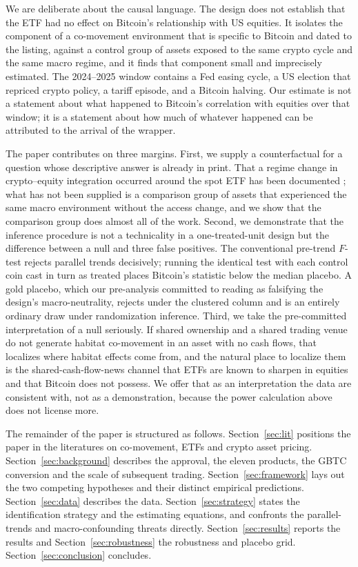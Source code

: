 \documentclass[12pt,a4paper]{article}
\begin{document}
We are deliberate about the causal language. The design does not establish that the ETF had no effect on Bitcoin's relationship with US equities. It isolates the component of a co-movement environment that is specific to Bitcoin and dated to the listing, against a control group of assets exposed to the same crypto cycle and the same macro regime, and it finds that component small and imprecisely estimated. The 2024--2025 window contains a Fed easing cycle, a US election that repriced crypto policy, a tariff episode, and a Bitcoin halving. Our estimate is not a statement about what happened to Bitcoin's correlation with equities over that window; it is a statement about how much of whatever happened can be attributed to the arrival of the wrapper.

The paper contributes on three margins. First, we supply a counterfactual for a question whose descriptive answer is already in print. That a regime change in crypto--equity integration occurred around the spot ETF has been documented \citep{khatib2026from}; what has not been supplied is a comparison group of assets that experienced the same macro environment without the access change, and we show that the comparison group does almost all of the work. Second, we demonstrate that the inference procedure is not a technicality in a one-treated-unit design but the difference between a null and three false positives. The conventional pre-trend $F$-test rejects parallel trends decisively; running the identical test with each control coin cast in turn as treated places Bitcoin's statistic below the median placebo. A gold placebo, which our pre-analysis committed to reading as falsifying the design's macro-neutrality, rejects under the clustered column and is an entirely ordinary draw under randomization inference. Third, we take the pre-committed interpretation of a null seriously. If shared ownership and a shared trading venue do not generate habitat co-movement in an asset with no cash flows, that localizes where habitat effects come from, and the natural place to localize them is the shared-cash-flow-news channel that ETFs are known to sharpen in equities \citep{glosten2020etf,israeli2017is} and that Bitcoin does not possess. We offer that as an interpretation the data are consistent with, not as a demonstration, because the power calculation above does not license more.

The remainder of the paper is structured as follows. Section~\ref{sec:lit} positions the paper in the literatures on co-movement, ETFs and crypto asset pricing. Section~\ref{sec:background} describes the approval, the eleven products, the GBTC conversion and the scale of subsequent trading. Section~\ref{sec:framework} lays out the two competing hypotheses and their distinct empirical predictions. Section~\ref{sec:data} describes the data. Section~\ref{sec:strategy} states the identification strategy and the estimating equations, and confronts the parallel-trends and macro-confounding threats directly. Section~\ref{sec:results} reports the results and Section~\ref{sec:robustness} the robustness and placebo grid. Section~\ref{sec:conclusion} concludes.
\end{document}
